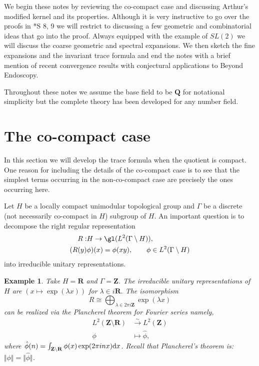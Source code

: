 \documentclass[11pt]{amsart}
\def\Q{\mathbf Q}
\def\R{\mathbf R}
\def\Z{\mathbf Z}
\def\d{\text d}
\def\bs{\setminus}
\def\Ltwo{L^2}
\def\norm#1{\Vert #1 \Vert} %
\newtheorem{example}[theorem]{Example}
\theoremstyle{remark}
\begin{document}
	We begin these notes by reviewing the co-compact case and discussing Arthur's modified kernel and its properties. Although it is very instructive to go over the proofs in \cite{clay}*{S 8, 9} we will restrict to discussing a few geometric and combinatorial ideas that go into the proof. Always equipped with the example of $SL(2)$ we will discuss the coarse geometric and spectral expansions. We then sketch the fine expansions and the invariant trace formula and end the notes with a brief mention of recent convergence results with conjectural applications to Beyond Endoscopy. 
	
	Throughout these notes we assume the base field to be $\Q$ for notational simplicity but the complete theory has been developed for any number field. 

\section{The co-compact case} \label{sec_cpt}

In this section we will develop the trace formula when the quotient is compact. One reason for including the details of the co-compact case is to see that the simplest terms occurring in the non-co-compact case are precisely the ones occurring here. 

Let $H$ be a locally compact unimodular topological group and $\Gamma$ be a discrete (not necessarily co-compact in $H$) subgroup of $H$. An important question is to decompose the right regular representation 
\begin{align*}
	R : & H \to \gl(\Ltwo(\Gamma \bs H)), \\
	(R(y) & \phi)(x) = \phi(xy), \qquad \phi \in \Ltwo(\Gamma\bs H)
\end{align*}
into irreducible unitary representations. 
\begin{example}
	Take $H = \R$ and $\Gamma = \Z$. The irreducible unitary representations of $H$ are $(x \mapsto \exp(\lambda x)) $ for $\lambda \in i\R.$ The isomorphism 
	\[ R \cong \displaystyle\bigoplus_{\lambda \in 2\pi i \Z} \exp(\lambda x) \]
	can be realized via the Plancherel theorem for Fourier series namely,
	\begin{align*}
		\Ltwo(\Z \bs \R) & \overset{\sim}{\longrightarrow} \Ltwo(\Z) \\
		\phi & \mapsto \hat\phi,
	\end{align*}
	where $\hat\phi(n) = \int_{\Z\bs \R} \phi(x) \exp(2\pi i n x) \d x$. Recall that Plancherel's theorem is: $\norm{\phi} = \norm{\hat\phi}$. 
\end{example}
\end{document}
